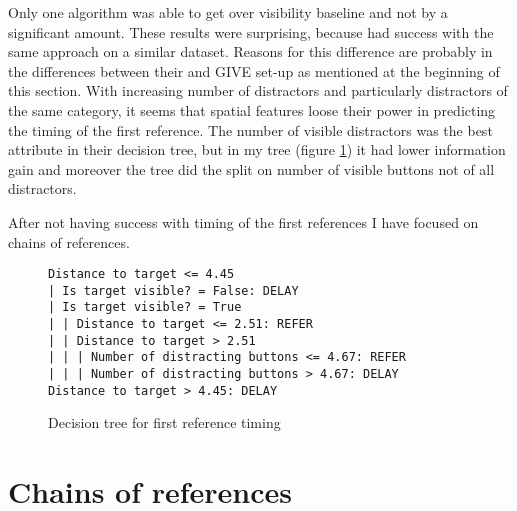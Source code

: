 Only one algorithm was able to get over visibility baseline and not by a significant amount. These results were surprising, because \citet{stoia2006sentence} had success with the same approach on a similar dataset. Reasons for this difference are probably in the differences between their and GIVE set-up as mentioned at the beginning of this section. With increasing number of distractors and particularly distractors of the same category, it seems that spatial features loose their power in predicting the timing of the first reference. The number of visible distractors was the best attribute in their decision tree, but in my tree (figure \ref{fig:dectree}) it had lower information gain and moreover the tree did the split on number of visible buttons not of all distractors.

After not having success with timing of the first references I have focused on chains of references.

\begin{figure}[h!]
\centering
\small
\begin{verbatim}
Distance to target <= 4.45
| Is target visible? = False: DELAY
| Is target visible? = True
| | Distance to target <= 2.51: REFER
| | Distance to target > 2.51
| | | Number of distracting buttons <= 4.67: REFER
| | | Number of distracting buttons > 4.67: DELAY
Distance to target > 4.45: DELAY
\end{verbatim}
\caption{Decision tree for first reference timing}
\label{fig:dectree}
\end{figure}

\section{Chains of references}

